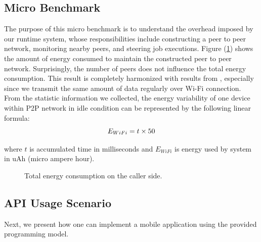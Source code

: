 \documentclass{sig-alternate}
\begin{document}
\subsection{Micro Benchmark}
The purpose of this micro benchmark is to understand the overhead imposed by our runtime system, whose responsibilities include constructing a peer to peer network, monitoring nearby peers, and steering job executions. Figure (\ref{fig:microb_24}) shows the amount of energy consumed to maintain the constructed peer to peer network. Surprisingly, the number of peers does not influence the total energy consumption. This result is completely harmonized with results from \cite{wifi_energy}, especially since we transmit the same amount of data regularly over Wi-Fi connection. From the statistic information we collected, the energy variability of one device within P2P network in idle condition can be represented by the following linear formula:
\begin{equation} \small
\label{eq:wifi_overload}
E_{WiFi} = t \times 50
\end{equation}

\noindent 
where $t$ is accumulated time in milliseconds and $E_{WiFi}$ is energy used by system in uAh (micro ampere hour).

\begin{figure}
	\hspace*{-0.15cm}
	\caption{Total energy consumption on the caller side.}
	\label{fig:microb_24}
\end{figure}


\subsection{API Usage Scenario}
\label{sec:apiusage}
Next, we present how one can implement a mobile application using the provided programming model.
\end{document}
